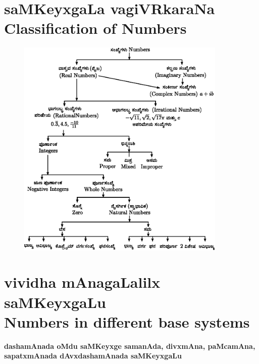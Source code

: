 \vfill
\eject

\section*{saMKeyxgaLa vagiVRkaraNa \\{\rm\bfseries Classification of Numbers}}
\begin{figure}[h]
\begin{center}
\includegraphics[width=10cm]{src/figure/165.eps}
\end{center}
\end{figure}

\vfill
\eject
\section*{vividha mAnagaLalilx saMKeyxgaLu\\{\rm\bfseries Numbers in different base systems}}

\textbf{dashamAnada oMdu saMKeyxge samanAda, divxmAna, paMcamAna, sapatxmAnada dAvxdashamAnada saMKeyxgaLu}

